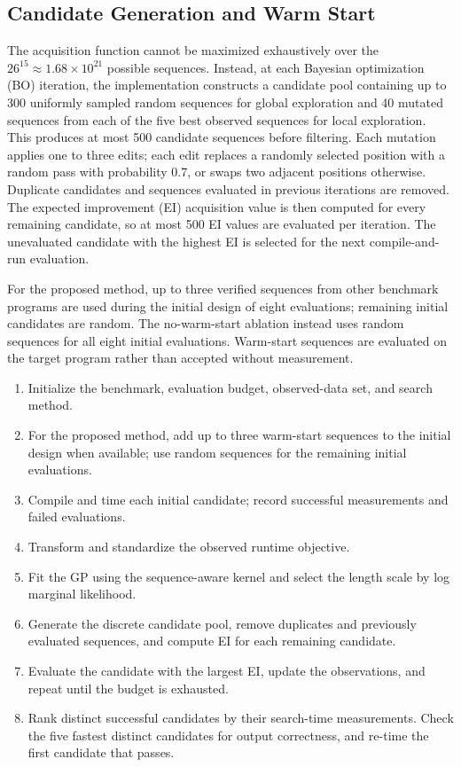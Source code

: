 \subsection{Candidate Generation and Warm Start}
The acquisition function cannot be maximized exhaustively over the $26^{15} \approx 1.68\times 10^{21}$ possible sequences. Instead, at each Bayesian optimization (BO) iteration, the implementation constructs a candidate pool containing up to 300 uniformly sampled random sequences for global exploration and 40 mutated sequences from each of the five best observed sequences for local exploration. This produces at most 500 candidate sequences before filtering. Each mutation applies one to three edits; each edit replaces a randomly selected position with a random pass with probability 0.7, or swaps two adjacent positions otherwise. Duplicate candidates and sequences evaluated in previous iterations are removed. The expected improvement (EI) acquisition value is then computed for every remaining candidate, so at most 500 EI values are evaluated per iteration. The unevaluated candidate with the highest EI is selected for the next compile-and-run evaluation.

For the proposed method, up to three verified sequences from other benchmark programs are used during the initial design of eight evaluations; remaining initial candidates are random. The no-warm-start ablation instead uses random sequences for all eight initial evaluations. Warm-start sequences are evaluated on the target program rather than accepted without measurement.

\begin{algorithm}[t]
\caption{Sequence-Aware Bayesian Optimization}
\label{alg:bo}
\begin{enumerate}[leftmargin=*,itemsep=0pt,label=\arabic*)]
\item Initialize the benchmark, evaluation budget, observed-data set, and search method.
\item For the proposed method, add up to three warm-start sequences to the initial design when available; use random sequences for the remaining initial evaluations.
\item Compile and time each initial candidate; record successful measurements and failed evaluations.
\item Transform and standardize the observed runtime objective.
\item Fit the GP using the sequence-aware kernel and select the length scale by log marginal likelihood.
\item Generate the discrete candidate pool, remove duplicates and previously evaluated sequences, and compute EI for each remaining candidate.
\item Evaluate the candidate with the largest EI, update the observations, and repeat until the budget is exhausted.
\item Rank distinct successful candidates by their search-time measurements. Check the five fastest distinct candidates for output correctness, and re-time the first candidate that passes.
\end{enumerate}
\end{algorithm}

